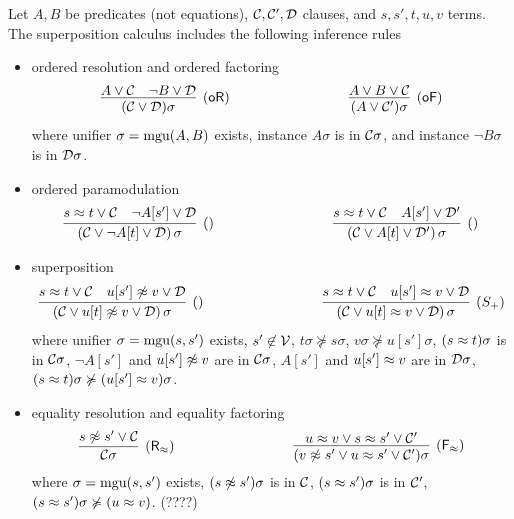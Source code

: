 
\begin{definition}\label{def:superposition-calculus}
	Let $A,B$ be predicates (not equations),
	${\mathcal C},{\mathcal C}',{\mathcal D}$ clauses, and $s,s', t,u,v$ terms.
	The {\myem superposition calculus} includes the following inference rules
	\begin{itemize}
		\item ordered resolution and ordered factoring
		\begin{gather*}
		\infer
		[\mathsf{(oR)}]
		{(\mcC \lor \mcD)\sigma}
		{{ A} \lor\mcC & { \lnot B} \lor\mcD}
		\hspace{3cm}
		\infer
		[\mathsf{(oF)}]
		{(A \lor \mcC')\sigma}
		{{ A}\lor B\lor\mcC}
		\end{gather*}
		where unifier $\sigma=\operatorname{mgu}(A,B)$ exists,
		instance $A\sigma$ is \txtSTRICTLY in ${\mathcal C}\sigma$,
		and	instance $\lnot B\sigma$ is \txtMAXIMAL in ${\mathcal D}\sigma$.
		\item ordered paramodulation
		\begin{gather*}
		\infer
		[\mathsf{()}]
		{(\mcC\lor \lnot A[t]\lor\mcD)\,\sigma}
		{{ s\mEQ t} \lor\mcC\quad { \lnot A[s']}\lor\mcD}
		\hspace{3cm}
		\infer
		[\mathsf{()}]
		{(\mcC\lor A[t]\lor\mcD')\,\sigma}
		{{ s\mEQ t} \lor\mcC\quad { A[s']}\lor\mcD'}
\end{gather*}
\item superposition
\begin{gather*}
		\infer
		[()]
		{(\mcC\lor u[t]\mNE v\lor\mcD)\,\sigma}
		{{ s\mEQ t}\lor\mcC\quad { u[s']\mNE v}\lor\mcD}
		\hspace{3cm}
		\infer
		[(S_+)]
		{(\mcC\lor u[t]\mEQ v\lor\mcD)\,\sigma}
		{{ s\mEQ t}\lor\mcC\quad { u[s']\mEQ v}\lor\mcD}
		\end{gather*}
		where unifier $\sigma=\operatorname{mgu}(s,s')$ exists,
		$s'\not\in{\mathcal V}$,
		$t\sigma\not\succcurlyeq s\sigma$,
		$v\sigma\not\succcurlyeq u[s']\sigma$,
		$(s\approx t)\sigma$ is \txtSTRICTLY in ${\mathcal C}\sigma$,
		$\lnot A[s']$ and $u[s']\not\approx v$ are \txtMAXIMAL in ${\mathcal C}\sigma$,
		$A[s']$ and $u[s']\approx v$ are \txtSTRICTLY in ${\mathcal D}\sigma$,
		$(s\approx t)\sigma\not\succcurlyeq(u[s']\approx v)\sigma$.
		\item
		equality resolution and equality factoring
		\[
		\infer
		[\mathsf{(R_\mEQ)}]
		{\mcC\sigma}
		{{s\mNE s'}\lor\mcC}
		\hspace{3cm}
		\infer
		[\mathsf{(F_\mEQ)}]
		{(v\mNE s'\lor u\mEQ s'\lor\mcC')\sigma}
		{{ u\mEQ v}\lor{s\mEQ s'}\lor\mcC'}
		\]
		where
		$\sigma=\operatorname{mgu}(s,s')$ exists,
		$(s\not\approx s')\sigma$ is \txtMAXIMAL in ${\mathcal C}$,
		$(s\approx s')\sigma$ is \txtSTRICTLY in ${\mathcal C}'$,
		$(s\approx s')\sigma\not\succcurlyeq(u\approx v)$. (????)
	\end{itemize}
\end{definition}
